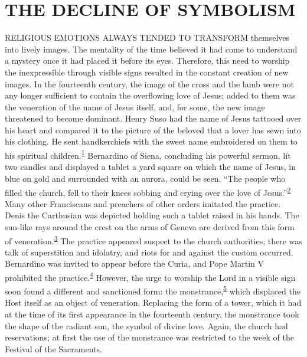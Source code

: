 \chapter{THE DECLINE OF SYMBOLISM}

RELIGIOUS EMOTIONS ALWAYS TENDED TO TRANSFORM themselves into lively
images. The mentality of the time believed it had come to understand a
mystery once it had placed it before its eyes. Therefore, this need to
worship the inexpressible through visible signs resulted in the constant
creation of new images. In the fourteenth century, the image of the
cross and the lamb were not any longer sufficient to contain the
overflowing love of Jesus; added to them was the veneration of the name
of Jesus itself, and, for some, the new image threatened to become
dominant. Henry Suso had the name of Jesus tattooed over his heart and
compared it to the picture of the beloved that a lover has sewn into his
clothing. He sent handkerchiefs with the sweet name embroidered on them
to his spiritual
children.\textsuperscript{\protect\hypertarget{16_Chapter_Nine__THE_DECLINE_OF_SYM.xhtmlux5cux23id_790}{\protect\hyperlink{23_NOTES.xhtmlux5cux23id_791}{1}}}
Bernardino of Siena, concluding his powerful sermon, lit two candles and
displayed a tablet a yard square on which the name of Jesus, in blue on
gold and surrounded with an aurora, could be seen. ``The people who
filled the church, fell to their knees sobbing and crying over the love
of
Jesus.''\textsuperscript{\protect\hypertarget{16_Chapter_Nine__THE_DECLINE_OF_SYM.xhtmlux5cux23id_788}{\protect\hyperlink{23_NOTES.xhtmlux5cux23id_789}{2}}}
Many other Franciscans and preachers of other orders imitated the
practice. Denis the Carthusian was depicted holding such a tablet raised
in his hands. The sun-like rays around the crest on the arms of Geneva
are derived from this form of
veneration.\textsuperscript{\protect\hypertarget{16_Chapter_Nine__THE_DECLINE_OF_SYM.xhtmlux5cux23id_786}{\protect\hyperlink{23_NOTES.xhtmlux5cux23id_787}{3}}}
The practice appeared suspect to the church authorities; there was talk
of superstition and idolatry, and riots for and against the custom
occurred. Bernardino was invited to appear before the Curia, and Pope
Martin V prohibited the
practice.\textsuperscript{\protect\hypertarget{16_Chapter_Nine__THE_DECLINE_OF_SYM.xhtmlux5cux23id_785}{\protect\hyperlink{23_NOTES.xhtmlux5cux23page_425}{4}}}
However, the urge to worship the Lord in a visible sign soon found a
different and sanctioned form: the
monstrance,\textsuperscript{\protect\hypertarget{16_Chapter_Nine__THE_DECLINE_OF_SYM.xhtmlux5cux23id_783}{\protect\hyperlink{23_NOTES.xhtmlux5cux23id_784}{5}}}
which displaced the Host itself as an object of veneration. Replacing
the form of a tower, which it had at the time of its first appearance in
the fourteenth century, the monstrance took the shape of the radiant
sun, the symbol of divine love. Again, the church had reservations; at
first the use of the
\protect\hypertarget{16_Chapter_Nine__THE_DECLINE_OF_SYM.xhtmlux5cux23page_235}{}{}monstrance
was restricted to the week of the Festival of the Sacraments.

